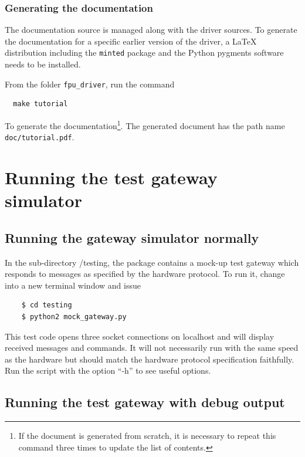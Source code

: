 \documentclass[11pt,a4paper]{report}
\begin{document}
\subsubsection{Generating the documentation}

The documentation source is managed along with the driver sources.  To
generate the documentation for a specific earlier version of the
driver, a \LaTeX{} distribution including the \texttt{minted} package
and the Python pygments software needs to be installed.

From the folder \texttt{fpu\_driver}, run the
command

\begin{verbatim}
  make tutorial
\end{verbatim}

To generate the documentation\footnote{If the document is generated
  from scratch, it is necessary to repeat this command three times to
  update the list of contents.}. The generated document has the path
name \texttt{doc/tutorial.pdf}.


\section{Running the test gateway simulator} 
\subsection{Running the gateway simulator normally}
In the sub-directory /testing, the package contains a mock-up test
gateway which responds to messages as specified by the hardware
protocol. To run it, change into a new terminal window and
issue

  \begin{verbatim}
    $ cd testing
    $ python2 mock_gateway.py
  \end{verbatim}    


This test code opens three socket connections on localhost and will
display received messages and commands. It will not necessarily run
with the same speed as the hardware but should match the hardware
protocol specification faithfully. Run the script with the option
``-h'' to see useful options.

\subsection{Running the test gateway with debug output}
\end{document}
